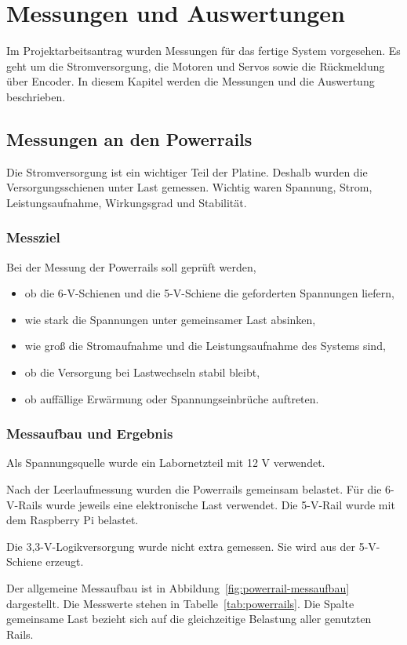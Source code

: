 \newpage
\section{Messungen und Auswertungen}
Im Projektarbeitsantrag wurden Messungen für das fertige System vorgesehen. Es geht um die Stromversorgung, die Motoren und Servos sowie die Rückmeldung über Encoder. In diesem Kapitel werden die Messungen und die Auswertung beschrieben.

\subsection{Messungen an den Powerrails}
Die Stromversorgung ist ein wichtiger Teil der Platine. Deshalb wurden die Versorgungsschienen unter Last gemessen. Wichtig waren Spannung, Strom, Leistungsaufnahme, Wirkungsgrad und Stabilität.

\subsubsection{Messziel}
Bei der Messung der Powerrails soll geprüft werden,

\begin{itemize}
	\item ob die 6-V-Schienen und die 5-V-Schiene die geforderten Spannungen liefern,
	\item wie stark die Spannungen unter gemeinsamer Last absinken,
	\item wie groß die Stromaufnahme und die Leistungsaufnahme des Systems sind,
	\item ob die Versorgung bei Lastwechseln stabil bleibt,
	\item ob auffällige Erwärmung oder Spannungseinbrüche auftreten.
\end{itemize}

\subsubsection{Messaufbau und Ergebnis}
Als Spannungsquelle wurde ein Labornetzteil mit 12 V verwendet.

Nach der Leerlaufmessung wurden die Powerrails gemeinsam belastet. Für die 6-V-Rails wurde jeweils eine elektronische Last verwendet. Die 5-V-Rail wurde mit dem Raspberry Pi belastet.

Die 3,3-V-Logikversorgung wurde nicht extra gemessen. Sie wird aus der 5-V-Schiene erzeugt.

Der allgemeine Messaufbau ist in Abbildung~\ref{fig:powerrail-messaufbau} dargestellt. Die Messwerte stehen in Tabelle~\ref{tab:powerrails}. Die Spalte \glqq gemeinsame Last\grqq{} bezieht sich auf die gleichzeitige Belastung aller genutzten Rails.

